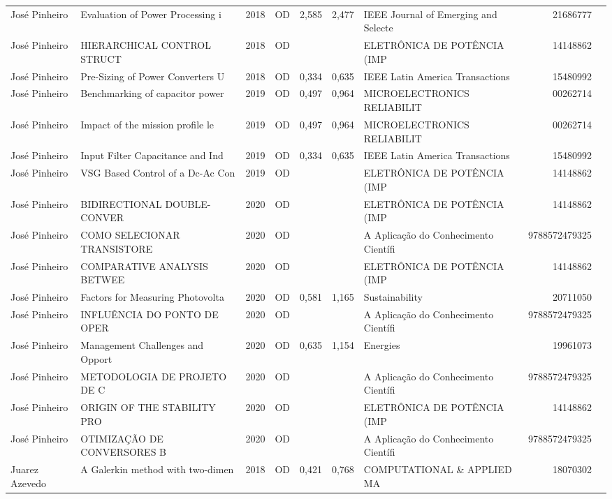 \documentclass[12pt,brazil]{article}\usepackage[]{graphicx}\usepackage[]{xcolor}
\begin{document}
\begin{longtable}{lllrrllrr}
José Pinheiro & Evaluation of Power Processing i & 2018 & OD & 2,585 & 2,477 & IEEE Journal of Emerging and Selecte & 21686777 \\
José Pinheiro & HIERARCHICAL CONTROL STRUCT & 2018 & OD &  &  & ELETRÔNICA DE POTÊNCIA (IMP & 14148862 \\
José Pinheiro & Pre-Sizing of Power Converters U & 2018 & OD & 0,334 & 0,635 & IEEE Latin America Transactions & 15480992 \\
José Pinheiro & Benchmarking of capacitor power  & 2019 & OD & 0,497 & 0,964 & MICROELECTRONICS RELIABILIT & 00262714 \\
José Pinheiro & Impact of the mission profile le & 2019 & OD & 0,497 & 0,964 & MICROELECTRONICS RELIABILIT & 00262714 \\
José Pinheiro & Input Filter Capacitance and Ind & 2019 & OD & 0,334 & 0,635 & IEEE Latin America Transactions & 15480992 \\
José Pinheiro & VSG Based Control of a Dc-Ac Con & 2019 & OD &  &  & ELETRÔNICA DE POTÊNCIA (IMP & 14148862 \\
José Pinheiro & BIDIRECTIONAL DOUBLE-CONVER & 2020 & OD &  &  & ELETRÔNICA DE POTÊNCIA (IMP & 14148862 \\
José Pinheiro & COMO SELECIONAR TRANSISTORE & 2020 & OD &  &  & A Aplicação do Conhecimento Científi & 9788572479325 \\
José Pinheiro & COMPARATIVE ANALYSIS BETWEE & 2020 & OD &  &  & ELETRÔNICA DE POTÊNCIA (IMP & 14148862 \\
José Pinheiro & Factors for Measuring Photovolta & 2020 & OD & 0,581 & 1,165 & Sustainability & 20711050 \\
José Pinheiro & INFLUÊNCIA DO PONTO DE OPER & 2020 & OD &  &  & A Aplicação do Conhecimento Científi & 9788572479325 \\
José Pinheiro & Management Challenges and Opport & 2020 & OD & 0,635 & 1,154 & Energies & 19961073 \\
José Pinheiro & METODOLOGIA DE PROJETO DE C & 2020 & OD &  &  & A Aplicação do Conhecimento Científi & 9788572479325 \\
José Pinheiro & ORIGIN OF THE STABILITY PRO & 2020 & OD &  &  & ELETRÔNICA DE POTÊNCIA (IMP & 14148862 \\
José Pinheiro & OTIMIZAÇÃO DE CONVERSORES B & 2020 & OD &  &  & A Aplicação do Conhecimento Científi & 9788572479325 \\
Juarez Azevedo & A Galerkin method with two-dimen & 2018 & OD & 0,421 & 0,768 & COMPUTATIONAL \& APPLIED MA & 18070302 \\

\end{longtable}
\end{document}
